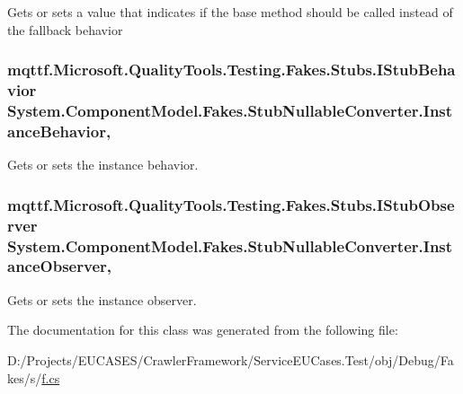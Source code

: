 Gets or sets a value that indicates if the base method should be called instead of the fallback behavior

\hypertarget{class_system_1_1_component_model_1_1_fakes_1_1_stub_nullable_converter_a120004ddd087530142549e52d19d72e6}{
\subsubsection[{Instance\-Behavior}]{\setlength{\rightskip}{0pt plus 5cm}mqttf.\-Microsoft.\-Quality\-Tools.\-Testing.\-Fakes.\-Stubs.\-I\-Stub\-Behavior System.\-Component\-Model.\-Fakes.\-Stub\-Nullable\-Converter.\-Instance\-Behavior\hspace{0.3cm}{\ttfamily [get]}, {\ttfamily [set]}}}\label{class_system_1_1_component_model_1_1_fakes_1_1_stub_nullable_converter_a120004ddd087530142549e52d19d72e6}


Gets or sets the instance behavior.

\hypertarget{class_system_1_1_component_model_1_1_fakes_1_1_stub_nullable_converter_ae4174f3f650b6ca71d576471036c1300}{
\subsubsection[{Instance\-Observer}]{\setlength{\rightskip}{0pt plus 5cm}mqttf.\-Microsoft.\-Quality\-Tools.\-Testing.\-Fakes.\-Stubs.\-I\-Stub\-Observer System.\-Component\-Model.\-Fakes.\-Stub\-Nullable\-Converter.\-Instance\-Observer\hspace{0.3cm}{\ttfamily [get]}, {\ttfamily [set]}}}\label{class_system_1_1_component_model_1_1_fakes_1_1_stub_nullable_converter_ae4174f3f650b6ca71d576471036c1300}


Gets or sets the instance observer.



The documentation for this class was generated from the following file\-:\begin{DoxyCompactItemize}
\item 
D\-:/\-Projects/\-E\-U\-C\-A\-S\-E\-S/\-Crawler\-Framework/\-Service\-E\-U\-Cases.\-Test/obj/\-Debug/\-Fakes/s/\hyperlink{s_2f_8cs}{f.\-cs}\end{DoxyCompactItemize}
